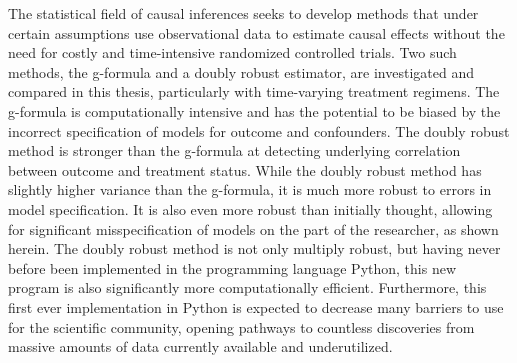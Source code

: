 
The statistical field of causal inferences seeks to develop methods that under certain assumptions use observational data to estimate causal effects without the need for costly and time-intensive randomized controlled trials.  Two such methods, the g-formula and a doubly robust estimator, are investigated and compared in this thesis, particularly with time-varying treatment regimens.  The g-formula is computationally intensive and has the potential to be biased by the incorrect specification of models for outcome and confounders.  The doubly robust method is stronger than the g-formula at detecting underlying correlation between outcome and treatment status.  While the doubly robust method has slightly higher variance than the g-formula, it is much more robust to errors in model specification.  It is also even more robust than initially thought, allowing for significant misspecification of models on the part of the researcher, as shown herein.   The doubly robust method is not only multiply robust, but having never before been implemented in the programming language Python, this new program is also significantly more computationally efficient.  Furthermore, this first ever implementation in Python is expected to decrease many barriers to use for the scientific community, opening pathways to countless discoveries from massive amounts of data currently available and underutilized.  
